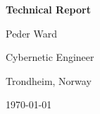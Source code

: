 \begin{titlepage}
    \centering
    \vspace*{3cm} %

    {\Huge \textbf{Technical Report}} %
    \vspace{1.5cm} %

    {\LARGE Peder Ward} \\ %
    \vspace{0.5cm} %

    {\Large Cybernetic Engineer} \\ %
    \vspace{0.5cm}

    {\Large Trondheim, Norway} %
    \vfill %

    {\large \today} %
\end{titlepage}

